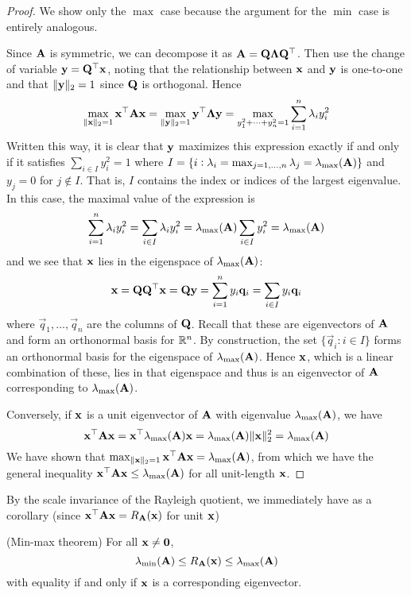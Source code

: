 \begin{proof}
We show only the $\max$ case because the argument for the $\min$ case is entirely analogous.

Since $\mathbf{A}$ is symmetric, we can decompose it as $\mathbf{A} = \mathbf{Q}\mathbf{\Lambda}\mathbf{Q}^\top$.
Then use the change of variable $\mathbf{y} = \mathbf{Q}^\top\mathbf{x}$, noting that the relationship between $\mathbf{x}$ and $\mathbf{y}$ is one-to-one and that $\|\mathbf{y}\|_2 = 1$ since $\mathbf{Q}$ is orthogonal.
Hence
\[\max_{\|\mathbf{x}\|_2 = 1} \mathbf{x}^\top\mathbf{A}\mathbf{x} = \max_{\|\mathbf{y}\|_2 = 1} \mathbf{y}^\top\mathbf{\Lambda}\mathbf{y} = \max_{y_1^2+\dots+y_n^2=1} \sum_{i=1}^n \lambda_i y_i^2\]
Written this way, it is clear that $\mathbf{y}$ maximizes this expression exactly if and only if it satisfies $\sum_{i \in I} y_i^2 = 1$ where $I = \{i : \lambda_i = \max_{j=1,\dots,n} \lambda_j = \lambda_{\max}(\mathbf{A})\}$ and $y_j = 0$ for $j \not\in I$.
That is, $I$ contains the index or indices of the largest eigenvalue.
In this case, the maximal value of the expression is
\[\sum_{i=1}^n \lambda_i y_i^2 = \sum_{i \in I} \lambda_i y_i^2 = \lambda_{\max}(\mathbf{A}) \sum_{i \in I} y_i^2 = \lambda_{\max}(\mathbf{A})\]
and we see that $\mathbf{x}$ lies in the eigenspace of $\lambda_{\max}(\mathbf{A})$:
\[\mathbf{x} = \mathbf{Q}\mathbf{Q}^\top\mathbf{x} = \mathbf{Q}\mathbf{y} = \sum_{i=1}^n y_i\mathbf{q}_i = \sum_{i \in I} y_i\mathbf{q}_i\]
where $\vec{q}_1, \dots, \vec{q}_n$ are the columns of $\mathbf{Q}$.
Recall that these are eigenvectors of $\mathbf{A}$ and form an orthonormal basis for $\mathbb{R}^n$.
By construction, the set $\{\vec{q}_i : i \in I\}$ forms an orthonormal basis for the eigenspace of $\lambda_{\max}(\mathbf{A})$.
Hence $\mathbf{x}$, which is a linear combination of these, lies in that eigenspace and thus is an eigenvector of $\mathbf{A}$ corresponding to $\lambda_{\max}(\mathbf{A})$.

Conversely, if $\mathbf{x}$ is a unit eigenvector of $\mathbf{A}$ with eigenvalue $\lambda_{\max}(\mathbf{A})$, we have
\[\mathbf{x}^\top\mathbf{A}\mathbf{x} = \mathbf{x}^\top\lambda_{\max}(\mathbf{A})\mathbf{x} = \lambda_{\max}(\mathbf{A})\|\mathbf{x}\|_2^2 = \lambda_{\max}(\mathbf{A})\]
We have shown that $\max_{\|\mathbf{x}\|_2 = 1} \mathbf{x}^\top\mathbf{A}\mathbf{x} = \lambda_{\max}(\mathbf{A})$, from which we have the general inequality $\mathbf{x}^\top\mathbf{A}\mathbf{x} \leq \lambda_{\max}(\mathbf{A})$ for all unit-length $\mathbf{x}$.
\end{proof}
By the scale invariance of the Rayleigh quotient, we immediately have as a corollary (since $\mathbf{x}^\top\mathbf{A}\mathbf{x} = R_{\mathbf{A}}(\mathbf{x})$ for unit $\mathbf{x}$)
\begin{theorem}
(Min-max theorem)
For all $\mathbf{x} \neq \mathbf{0}$,
\[\lambda_{\min}(\mathbf{A}) \leq R_{\mathbf{A}}(\mathbf{x}) \leq \lambda_{\max}(\mathbf{A})\]
with equality if and only if $\mathbf{x}$ is a corresponding eigenvector.
\end{theorem}
